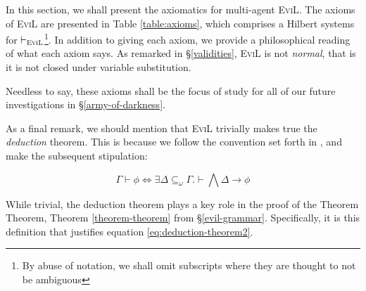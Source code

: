 In this section, we shall present the axiomatics for multi-agent
\textsc{EviL}. The axioms of \textsc{EviL} are presented in 
Table \ref{table:axioms}, which comprises a Hilbert systems for
$\vdash_{\textsc{EviL}}$\footnote{By abuse of notation, we shall omit
  subscripts where they are thought to not be ambiguous}.  In addition
to giving each axiom, we provide a philosophical reading of what each
axiom says.  As remarked in \S\ref{validities}, \textsc{EviL} is not
\emph{normal}, that is it is not closed under variable substitution.



Needless to say, these axioms shall be the focus of study for all of
our future investigations in \S\ref{army-of-darkness}.

As a final remark, we should mention that \textsc{EviL} trivially
makes true the \emph{deduction} theorem. This is because we follow
the convention set forth in \cite[Definition 4.4,
pg. 192]{blackburn_modal_2001}, and make the subsequent stipulation:
\begin{mydef}
\[ \Gamma \vdash \phi \iff  \exists \Delta \subseteq_\omega
\Gamma. \vdash \bigwedge \Delta \to \phi \]
\end{mydef}
While trivial, the deduction theorem plays a key role in the proof of
the Theorem Theorem, Theorem \ref{theorem-theorem} from
\S\ref{evil-grammar}.  Specifically, it is this definition that
justifies equation \ref{eq:deduction-theorem2}.






